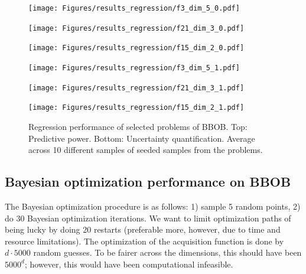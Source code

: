\begin{figure}[H]
  \centering
  \begin{minipage}[b]{0.32\textwidth}
   \texttt{[image: Figures/results\_regression/f3\_dim\_5\_0.pdf]}
  \end{minipage}
  \hfill
  \begin{minipage}[b]{0.32\textwidth}
    \texttt{[image: Figures/results\_regression/f21\_dim\_3\_0.pdf]}
   \end{minipage}
   \hfill
   \begin{minipage}[b]{0.32\textwidth}
    \texttt{[image: Figures/results\_regression/f15\_dim\_2\_0.pdf]}
   \end{minipage}
   
     \begin{minipage}[b]{0.32\textwidth}
   \texttt{[image: Figures/results\_regression/f3\_dim\_5\_1.pdf]}
  \end{minipage}
  \hfill
  \begin{minipage}[b]{0.32\textwidth}
    \texttt{[image: Figures/results\_regression/f21\_dim\_3\_1.pdf]}
   \end{minipage}
   \hfill
   \begin{minipage}[b]{0.32\textwidth}
    \texttt{[image: Figures/results\_regression/f15\_dim\_2\_1.pdf]}
   \end{minipage}
   
  \caption{Regression performance of selected problems of BBOB. Top: Predictive power. Bottom:
  Uncertainty quantification. Average across 10 different samples of seeded samples from the
  problems.}
  \label{BBOB_regression}
\end{figure}


\subsection{Bayesian optimization performance on BBOB}
The Bayesian optimization procedure is as follows: 1) sample 5 random points, 2) do 30 Bayesian
optimization iterations. We want to limit optimization paths of being lucky by doing 20
restarts (preferable more, however, due to time and resource limitations). The optimization of the
acquisition function is done by $d \cdot 5000$ random guesses. To be fairer across the dimensions,
this should have been $5000^d$; however, this would have been computational infeasible. 

